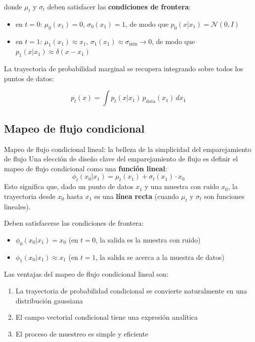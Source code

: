 donde $\mu_t$ y $\sigma_t$ deben satisfacer las \textbf{condiciones de frontera}:
\begin{itemize}
    \item en $t = 0$: $\mu_0(x_1) = 0$, $\sigma_0(x_1) = 1$, de modo que $p_0(x | x_1) = \mathcal{N}(0, I)$
    \item en $t = 1$: $\mu_1(x_1) \approx x_1$, $\sigma_1(x_1) \approx \sigma_{\min} \to 0$, de modo que $p_1(x | x_1) \approx \delta(x - x_1)$
\end{itemize}

La trayectoria de probabilidad marginal se recupera integrando sobre todos los puntos de datos:

$$p_t(x) = \int p_t(x | x_1) \, p_{\text{data}}(x_1) \, dx_1$$

\subsection{Mapeo de flujo condicional}

\begin{importantbox}{Mapeo de flujo condicional lineal: la belleza de la simplicidad del emparejamiento de flujo}
Una elección de diseño clave del emparejamiento de flujo es definir el mapeo de flujo condicional como una \textbf{función lineal}:
$$\phi_t(x_0 | x_1) = \mu_t(x_1) + \sigma_t(x_1) \cdot x_0$$
Esto significa que, dado un punto de datos $x_1$ y una muestra con ruido $x_0$, la trayectoria desde $x_0$ hasta $x_1$ es una \textbf{línea recta} (cuando $\mu_t$ y $\sigma_t$ son funciones lineales).

Deben satisfacerse las condiciones de frontera:
\begin{itemize}
    \item $\phi_0(x_0 | x_1) = x_0$ (en $t=0$, la salida es la muestra con ruido)
    \item $\phi_1(x_0 | x_1) \approx x_1$ (en $t=1$, la salida se acerca a la muestra de datos)
\end{itemize}
\end{importantbox}

Las ventajas del mapeo de flujo condicional lineal son:
\begin{enumerate}
    \item La trayectoria de probabilidad condicional se convierte naturalmente en una distribución gaussiana
    \item El campo vectorial condicional tiene una expresión analítica
    \item El proceso de muestreo es simple y eficiente
\end{enumerate}

